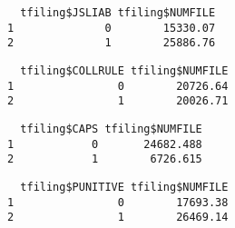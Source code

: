 \documentclass[]{book}
\newenvironment{Shaded}{\begin{snugshade}}{\end{snugshade}}
\newcommand{\KeywordTok}[1]{\textcolor[rgb]{0.13,0.29,0.53}{\textbf{#1}}}
\newcommand{\NormalTok}[1]{#1}
\newcommand{\OperatorTok}[1]{\textcolor[rgb]{0.81,0.36,0.00}{\textbf{#1}}}
\begin{document}
\begin{Shaded}
\end{Shaded}

\begin{verbatim}
  tfiling$JSLIAB tfiling$NUMFILE
1              0        15330.07
2              1        25886.76
\end{verbatim}

\begin{Shaded}
\end{Shaded}

\begin{verbatim}
  tfiling$COLLRULE tfiling$NUMFILE
1                0        20726.64
2                1        20026.71
\end{verbatim}

\begin{Shaded}
\end{Shaded}

\begin{verbatim}
  tfiling$CAPS tfiling$NUMFILE
1            0       24682.488
2            1        6726.615
\end{verbatim}

\begin{Shaded}
\end{Shaded}

\begin{verbatim}
  tfiling$PUNITIVE tfiling$NUMFILE
1                0        17693.38
2                1        26469.14
\end{verbatim}
\end{document}
